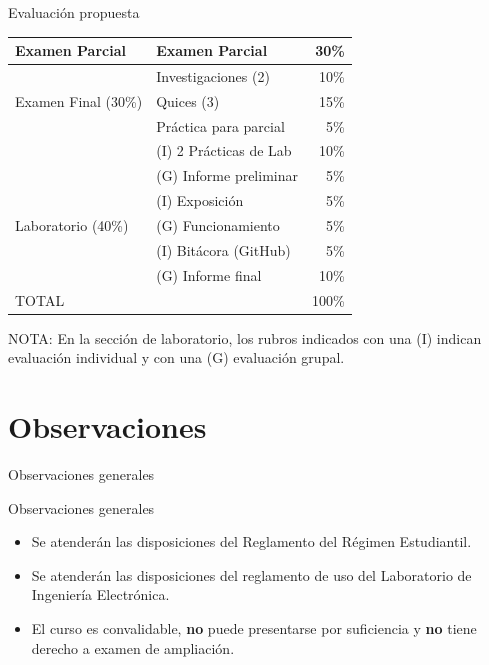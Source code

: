 \documentclass[xcolor=dvipsnames]{beamer}
\newcommand{\pageframe}[1]{\frame{\begin{center}{ \Huge #1 }\end{center}}}
\begin{document}
\begin{frame}{Evaluación propuesta}
\begin{center}
\begin{tabular}{|l|l|r|}\hline
	Examen Parcial		& Examen Parcial	& 	30\%\\\hline
				& Investigaciones (2)	&	10\%\\\cline{2-3}
	Examen Final (30\%)			& Quices (3)		&	15\%\\\cline{2-3}
				& Práctica para parcial &	 5\%\\\hline
				& (I) 2 Prácticas de Lab	&	 10\%\\\cline{2-3}
				& (G) Informe preliminar	&	 5\%\\\cline{2-3}
				& (I) Exposición	&	5\%\\\cline{2-3}
	Laboratorio (40\%)	& (G) Funcionamiento	&	5\%\\\cline{2-3}
				& (I) Bitácora (GitHub)	&	 5\%\\\cline{2-3}
				& (G) Informe final		&	10\%\\\hline\hline
	\multicolumn{2}{|l|}{TOTAL}			&	100\%\\\hline
\end{tabular}
\end{center}
\scriptsize{NOTA: En la sección de laboratorio, los rubros indicados con una (I) indican evaluación individual y con una (G) evaluación grupal.}
\end{frame}
\section{Observaciones}

\pageframe{Observaciones}

\begin{frame}{Observaciones generales}
  \begin{block}{Observaciones generales}
    \begin{itemize}[<+->]
      \item Se atenderán las disposiciones del Reglamento del Régimen Estudiantil.
      \item Se atenderán las disposiciones del reglamento de uso del Laboratorio de Ingeniería Electrónica.
      \item El curso es convalidable, \textbf{no} puede presentarse por suficiencia y \textbf{no} tiene derecho a examen de ampliación.
    \end{itemize}
  \end{block}
\end{frame}
\end{document}
